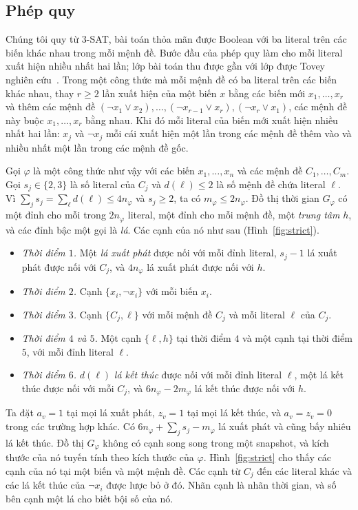 \documentclass[pdflatex,sn-mathphys-num]{sn-jnl}
\theoremstyle{thmstyleone}%
\theoremstyle{thmstyletwo}%
\theoremstyle{thmstylethree}%
\begin{document}
\subsection{Phép quy}

Chúng tôi quy từ 3-SAT, bài toán thỏa mãn được Boolean với ba literal trên các biến khác nhau trong mỗi mệnh đề. Bước đầu của phép quy làm cho mỗi literal xuất hiện nhiều nhất hai lần; lớp bài toán thu được gần với lớp được Tovey nghiên cứu~\cite{tovey1984}. Trong một công thức mà mỗi mệnh đề có ba literal trên các biến khác nhau, thay $r\ge2$ lần xuất hiện của một biến $x$ bằng các biến mới $x_1,\dots,x_r$ và thêm các mệnh đề $(\lnot x_1\lor x_2),\dots,(\lnot x_{r-1}\lor x_r),(\lnot x_r\lor x_1)$, các mệnh đề này buộc $x_1,\dots,x_r$ bằng nhau. Khi đó mỗi literal của biến mới xuất hiện nhiều nhất hai lần: $x_j$ và $\lnot x_j$ mỗi cái xuất hiện một lần trong các mệnh đề thêm vào và nhiều nhất một lần trong các mệnh đề gốc.

Gọi $\varphi$ là một công thức như vậy với các biến $x_1,\dots,x_n$ và các mệnh đề $C_1,\dots,C_m$. Gọi $s_j\in\{2,3\}$ là số literal của $C_j$ và $d(\ell)\le2$ là số mệnh đề chứa literal $\ell$. Vì $\sum_js_j=\sum_\ell d(\ell)\le4n_\varphi$ và $s_j\ge2$, ta có $m_\varphi\le2n_\varphi$. Đồ thị thời gian $G_\varphi$ có một đỉnh cho mỗi trong $2n_\varphi$ literal, một đỉnh cho mỗi mệnh đề, một \emph{trung tâm} $h$, và các đỉnh bậc một gọi là \emph{lá}. Các cạnh của nó như sau (Hình~\ref{fig:strict}).
\begin{itemize}
\item \emph{Thời điểm $1$.} Một \emph{lá xuất phát} được nối với mỗi đỉnh literal, $s_j-1$ lá xuất phát được nối với $C_j$, và $4n_\varphi$ lá xuất phát được nối với $h$.
\item \emph{Thời điểm $2$.} Cạnh $\{x_i,\lnot x_i\}$ với mỗi biến $x_i$.
\item \emph{Thời điểm $3$.} Cạnh $\{C_j,\ell\}$ với mỗi mệnh đề $C_j$ và mỗi literal $\ell$ của $C_j$.
\item \emph{Thời điểm $4$ và $5$.} Một cạnh $\{\ell,h\}$ tại thời điểm $4$ và một cạnh tại thời điểm $5$, với mỗi đỉnh literal $\ell$.
\item \emph{Thời điểm $6$.} $d(\ell)$ \emph{lá kết thúc} được nối với mỗi đỉnh literal $\ell$, một lá kết thúc được nối với mỗi $C_j$, và $6n_\varphi-2m_\varphi$ lá kết thúc được nối với $h$.
\end{itemize}
Ta đặt $a_v=1$ tại mọi lá xuất phát, $z_v=1$ tại mọi lá kết thúc, và $a_v=z_v=0$ trong các trường hợp khác. Có $6n_\varphi+\sum_js_j-m_\varphi$ lá xuất phát và cũng bấy nhiêu lá kết thúc. Đồ thị $G_\varphi$ không có cạnh song song trong một snapshot, và kích thước của nó tuyến tính theo kích thước của $\varphi$. Hình~\ref{fig:strict} cho thấy các cạnh của nó tại một biến và một mệnh đề. Các cạnh từ $C_j$ đến các literal khác và các lá kết thúc của $\lnot x_i$ được lược bỏ ở đó. Nhãn cạnh là nhãn thời gian, và số bên cạnh một lá cho biết bội số của nó.
\end{document}

